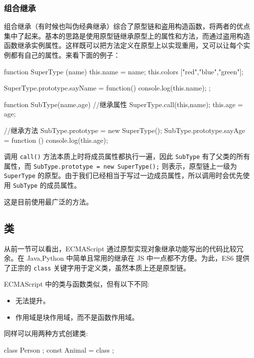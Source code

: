 \subsubsection{组合继承}

组合继承（有时候也叫伪经典继承）综合了原型链和盗用构造函数，将两者的优点集中了起来。基本的思路是使用原型链继承原型上的属性和方法，而通过盗用构造函数继承实例属性。这样既可以把方法定义在原型上以实现重用，又可以让每个实例都有自己的属性。来看下面的例子：

\begin{JavaScript}
function SuperType (name){
    this.name = name;
    this.colors ["red","blue","green"];
}
    
SuperType.prototype.sayName = function(){
    console.log(this.name);
};

function SubType(name,age){
    //继承属性
    SuperType.call(this,name);
    this.age = age;
}

//继承方法
SubType.prototype = new SuperType();
SubType.prototype.sayAge = function () {
    console.log(this.age);
}
\end{JavaScript}

调用 \texttt{call()} 方法本质上时将成员属性都执行一遍，因此 \texttt{SubType} 有了父类的所有属性，而 \texttt{SubType.prototype = new SuperType();} 则表示，原型链上一级为 \texttt{SuperType} 的原型。由于我们已经相当于写过一边成员属性，所以调用时会优先使用 \texttt{SubType} 的成员属性。

这是目前使用最广泛的方法。

\subsection{类}

从前一节可以看出，ECMAScript 通过原型实现对象继承功能写出的代码比较冗余。在 Java,Python 中简单且常用的继承在 JS 中一点都不方便。为此，ES6 提供了正宗的 \texttt{class} 关键字用于定义类，虽然本质上还是原型链。

ECMAScript 中的类与函数类似，但有以下不同:
\begin{itemize}
    \item 无法提升。
    \item 作用域是块作用域，而不是函数作用域。
\end{itemize}

同样可以用两种方式创建类:
\begin{JavaScript}
class Person {};
const Animal = class {}; 
\end{JavaScript}

